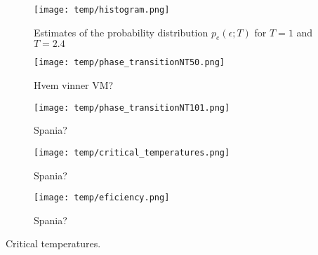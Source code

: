 \begin{figure}[!ht]
    \texttt{[image: temp/histogram.png]}
    \caption{Estimates of the probability distribution $p_e(\epsilon; T)$ for $T=1$ and $T=2.4$}
    \label{fig:histogram}
\end{figure}


\begin{figure*}[!ht]
    \texttt{[image: temp/phase\_transitionNT50.png]} 
    \caption{Hvem vinner VM?}
    \label{fig:phase_transition}
\end{figure*} 

\begin{figure}[!ht]
    \texttt{[image: temp/phase\_transitionNT101.png]} 
    \caption{Spania?}
    \label{fig:phase_transition_zoomed}
\end{figure} 

\begin{figure}[!ht]
    \texttt{[image: temp/critical\_temperatures.png]} 
    \caption{Spania?}
    \label{fig:critical_temperatures}
\end{figure} 

\begin{figure}[!ht]
    \texttt{[image: temp/eficiency.png]} 
    \caption{Spania?}
    \label{fig:efficiency}
\end{figure} 





\begin{table}[!ht]
    
    \caption{Critical temperatures.}
    \label{tab:critical_temperatures}
\end{table}

